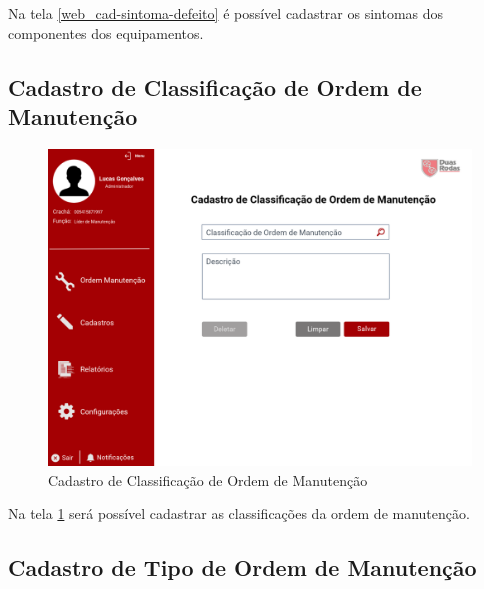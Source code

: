Na tela \ref{web_cad-sintoma-defeito} é possível cadastrar os sintomas dos componentes dos equipamentos.

\newpage
\subsection{Cadastro de Classificação de Ordem de Manutenção}

\begin{figure}[htb]
	\caption{\label{web_cad-classificacao-om}Cadastro de Classificação de Ordem de Manutenção}
	\begin{center}
		\includegraphics[scale=0.55]{./Figuras/web/cad-classificacao-om.png}
	\end{center}
\end{figure}

Na tela \ref{web_cad-classificacao-om} será possível cadastrar as classificações da ordem de manutenção.

\newpage
\subsection{Cadastro de Tipo de Ordem de Manutenção}

